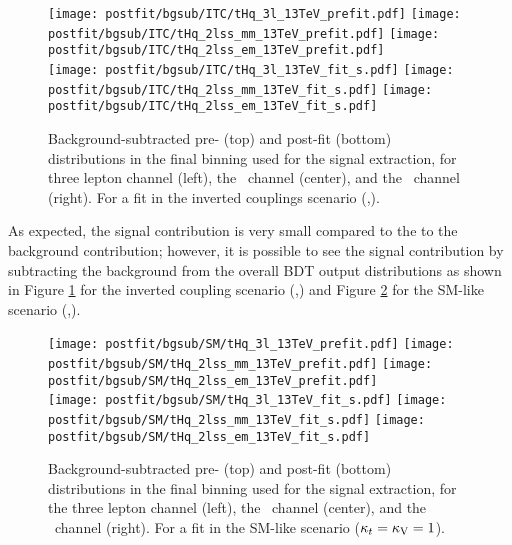 \begin{figure} [!h]
 \centering
 \texttt{[image: postfit/bgsub/ITC/tHq\_3l\_13TeV\_prefit.pdf]}
 \texttt{[image: postfit/bgsub/ITC/tHq\_2lss\_mm\_13TeV\_prefit.pdf]}
 \texttt{[image: postfit/bgsub/ITC/tHq\_2lss\_em\_13TeV\_prefit.pdf]} \\
 \texttt{[image: postfit/bgsub/ITC/tHq\_3l\_13TeV\_fit\_s.pdf]}
 \texttt{[image: postfit/bgsub/ITC/tHq\_2lss\_mm\_13TeV\_fit\_s.pdf]}
 \texttt{[image: postfit/bgsub/ITC/tHq\_2lss\_em\_13TeV\_fit\_s.pdf]}
\caption[Background-subtracted distributions in the final binning (ITC).]{Background-subtracted pre- (top) and post-fit (bottom) distributions in the final binning used for the signal extraction, for three lepton channel (left), the \mumu\ channel (center), and the \emu\ channel (right). For a fit in the inverted couplings scenario (,).}
\label{fig:postfit_bgsub_ITC}
\end{figure}

As expected, the signal contribution is very small compared to the to the background contribution; however, it is possible to see the signal contribution by subtracting the background from the overall BDT output distributions as shown in Figure \ref{fig:postfit_bgsub_ITC} for the inverted coupling scenario (,) and Figure \ref{fig:postfit_bgsub_SM} for the SM-like scenario (,).  

\begin{figure} [!h]
 \centering
 \texttt{[image: postfit/bgsub/SM/tHq\_3l\_13TeV\_prefit.pdf]}
 \texttt{[image: postfit/bgsub/SM/tHq\_2lss\_mm\_13TeV\_prefit.pdf]}
 \texttt{[image: postfit/bgsub/SM/tHq\_2lss\_em\_13TeV\_prefit.pdf]} \\
 \texttt{[image: postfit/bgsub/SM/tHq\_3l\_13TeV\_fit\_s.pdf]}
 \texttt{[image: postfit/bgsub/SM/tHq\_2lss\_mm\_13TeV\_fit\_s.pdf]}
 \texttt{[image: postfit/bgsub/SM/tHq\_2lss\_em\_13TeV\_fit\_s.pdf]}
\caption[Background-subtracted distributions in the final binning (SM)]{Background-subtracted pre- (top) and post-fit (bottom) distributions in the final binning used for the signal extraction, for the three lepton channel (left), the \mumu\ channel (center), and the \emu\ channel (right). For a fit in the SM-like scenario ($\kappa_t=\kappa_\text{V}=1$).}
\label{fig:postfit_bgsub_SM}
\end{figure}



